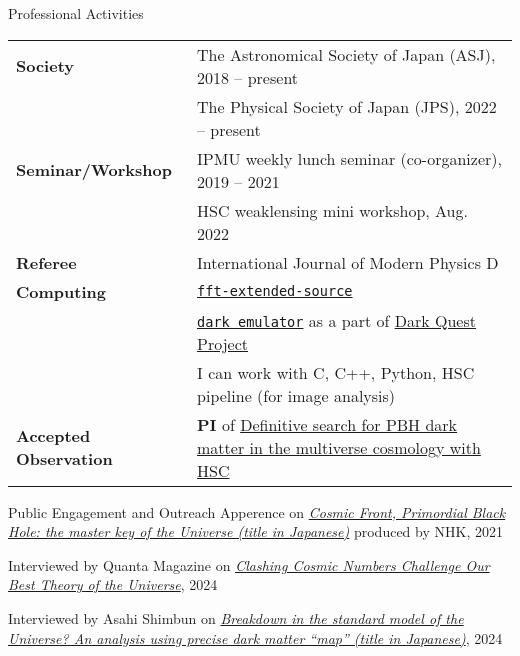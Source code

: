 \documentclass{../sty/resume} %
\begin{document}
\begin{rSection}{Professional Activities}
    \begin{tabular}{ @{} >{\bfseries}l @{\hspace{6ex}} p{}}
    Society              & The Astronomical Society of Japan (ASJ), 2018 -- present \\
                         & The Physical Society of Japan (JPS), 2022 -- present  \\
    Seminar/Workshop     & IPMU weekly lunch seminar (co-organizer), 2019 -- 2021 \\
                         & HSC weaklensing mini workshop, Aug. 2022  \\
    Referee              & International Journal of Modern Physics D \\
    Computing            & \href{https://github.com/git-sunao/fft-extended-source}{\tt fft-extended-source} \\
                         & \href{https://dark-emulator.readthedocs.io/en/latest/}{\tt dark emulator} as a part of \href{https://darkquestcosmology.github.io}{Dark Quest Project} \\
                         & I can work with C, C++, Python, HSC pipeline (for image analysis) \\
    Accepted Observation & {\textbf{PI}} of \href{https://subarutelescope.org/Observing/Schedule/S20B_abstract/S20B0032abst.html}{Definitive search for PBH dark matter in the multiverse cosmology with HSC}
    \end{tabular}
\end{rSection}

\begin{rSection}{Public Engagement and Outreach}
  Apperence on \href{https://www.nhk-ondemand.jp/goods/G2021114366SA000/}{\textit{Cosmic Front, Primordial Black Hole: the master key of the Universe (title in Japanese)}} produced by NHK, 2021

  Interviewed by Quanta Magazine on \href{https://www.quantamagazine.org/clashing-cosmic-numbers-challenge-our-best-theory-of-the-universe-20240119/}{\textit{Clashing Cosmic Numbers Challenge Our Best Theory of the Universe}}, 2024
  
  Interviewed by Asahi Shimbun on \href{https://www.asahi.com/articles/ASR4H415RR48ULBH001.html}{\textit{Breakdown in the standard model of the Universe? An analysis using precise dark matter ``map'' (title in Japanese)}}, 2024
\end{rSection}
\end{document}
